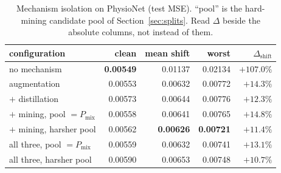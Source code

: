 \begin{table}[t]
\caption{Mechanism isolation on PhysioNet (test MSE\prelim). ``pool'' is the hard-mining candidate pool of
Section~\ref{sec:splits}. Read $\Delta$ beside the absolute columns, not instead of them.}
\label{tab:components}
\small
\begin{tabular}{lrrrr}
\toprule
configuration & clean & mean shift & worst & $\Delta_{\mathrm{shift}}$ \\
\midrule
no mechanism & \textbf{0.00549} & 0.01137 & 0.02134 & $+107.0\%$ \\
augmentation & 0.00553 & 0.00632 & 0.00772 & $+14.3\%$ \\
\quad $+$ distillation & 0.00573 & 0.00644 & 0.00776 & $+12.3\%$ \\
\quad $+$ mining, pool $=P_{\mathrm{mix}}$ & 0.00558 & 0.00641 & 0.00765 & $+14.8\%$ \\
\quad $+$ mining, harsher pool & 0.00562 & \textbf{0.00626} & \textbf{0.00721} & $+11.4\%$ \\
all three, pool $=P_{\mathrm{mix}}$ & 0.00559 & 0.00632 & 0.00741 & $+13.1\%$ \\
all three, harsher pool & 0.00590 & 0.00653 & 0.00748 & $\mathbf{+10.7\%}$ \\
\bottomrule
\end{tabular}
\end{table}
